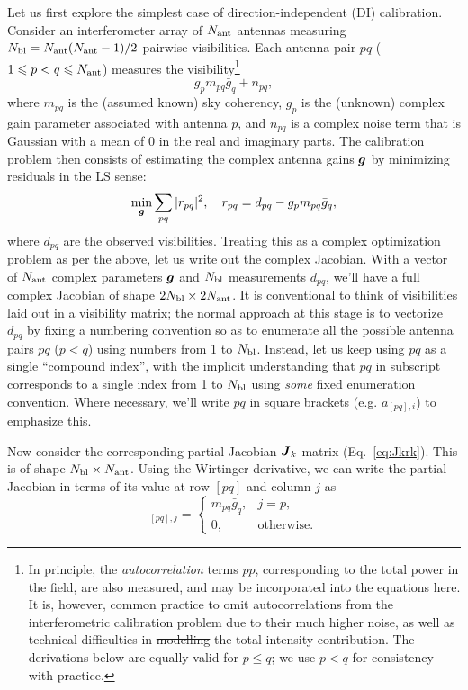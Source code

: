 \documentclass[useAMS,usenatbib]{mn2e}
\newcommand{\mat}[1]{{\bmath{#1}}}
\newcommand{\JJ}{\mat{J}} %
\numberwithin{equation}{section}
\providecommand{\DIFadd}[1]{{\protect\color{blue}\uwave{#1}}} %
\providecommand{\DIFdel}[1]{{\protect\color{red}\sout{#1}}}                      %
\providecommand{\DIFaddbegin}{} %
\providecommand{\DIFaddend}{} %
\providecommand{\DIFdelbegin}{} %
\providecommand{\DIFdelend}{} %
\begin{document}
Let us first explore the simplest case of direction-independent (DI) calibration. Consider an interferometer
array of $N_\mathrm{ant}$ antennas measuring $N_\mathrm{bl}=N_\mathrm{ant}(N_\mathrm{ant}-1)/2$ pairwise visibilities. Each antenna pair
$pq$ ($1\leqslant p<q\leqslant N_\mathrm{ant}$) 
measures the visibility\footnote{In principle, the {\em autocorrelation} terms $pp$, corresponding to the
total power in the field, are also measured, and may be incorporated into the equations here. 
It is, however, common practice to omit autocorrelations from the interferometric
calibration problem due to their much higher noise, as well as technical difficulties in \DIFdelbegin \DIFdel{modelling }\DIFdelend \DIFaddbegin \DIFadd{modeling }\DIFaddend the
total intensity contribution. The derivations below are equally valid for $p\leq q$; we use $p<q$ for consistency
with practice.}
\begin{equation}
\label{eq:RIME:unpol}
g_p m_{pq} \bar{g}_q + n_{pq},
\end{equation}
where $m_{pq}$ is the (assumed known) sky coherency, $g_p$ is the (unknown) complex gain parameter 
associated with antenna $p$, and $n_{pq}$ is a complex noise term that is Gaussian with a mean of 0 in the real and 
imaginary parts. The calibration problem then consists of estimating the complex antenna gains $\bmath{g}$ by
minimizing residuals in the LS sense:
\begin{equation}
\label{eq:cal:DI}
\min_{\bmath{g}}\sum_{pq}|r_{pq}|^2,~~~r_{pq}=d_{pq}-g_p m_{pq} \bar{g}_q, 
\end{equation}
where $d_{pq}$ are the observed visibilities. Treating this as a complex optimization problem as per the above, 
let us write out the complex Jacobian. 
With a vector of $N_\mathrm{ant}$ complex parameters $\bmath{g}$ and $N_\mathrm{bl}$ measurements $d_{pq}$, we'll have a full complex
Jacobian of shape $2N_\mathrm{bl}\times2N_\mathrm{ant}$. It is conventional
to think of visibilities laid out in a visibility matrix; the normal approach at this stage is to vectorize $d_{pq}$ 
by fixing a numbering convention so as to enumerate all the possible antenna pairs $pq$ ($p<q$) using numbers from 1 to $N_\mathrm{bl}$.
Instead, let us keep using $pq$ as a single ``compound index'', with the implicit understanding that $pq$ in 
subscript corresponds to a single index from 1 to $N_\mathrm{bl}$ using \emph{some} fixed enumeration convention. 
Where necessary, we'll write $pq$ in square brackets (e.g. $a_{[pq],i}$) to emphasize this.

Now consider the corresponding partial Jacobian $\JJ_k$ matrix (Eq.~\ref{eq:Jkrk}). This is of shape $N_\mathrm{bl}\times N_\mathrm{ant}$. 
Using the Wirtinger derivative, we can write the
partial Jacobian in terms of its value at row $[pq]$ and column $j$ as 
\begin{equation}
[ \JJ_k ]_{[pq],j} = \left \{  
  \begin{array}{ll} 
  m_{pq}\bar{g}_q,& j=p, \\
  0, & \mathrm{otherwise.}
  \end{array}
\right .
\end{equation}
\end{document}
